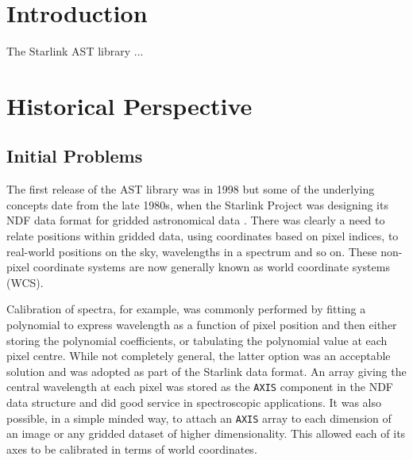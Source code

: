 \documentclass[final,authoryear,5p,times,twocolumn]{elsarticle}
\begin{document}

\newcommand{\mnras}{Mon Not R Astron Soc}
\newcommand{\aap}{Astron Astrophys}
\newcommand{\aaps}{Astron Astrophys Supp}
\newcommand{\pasp}{Pub Astron Soc Pacific}
\newcommand{\apj}{Astrophys J}
\newcommand{\apjs}{Astrophys J Supp}
\newcommand{\qjras}{Quart J R Astron Soc}
\newcommand{\an}{Astron.\ Nach.}
\newcommand{\ijimw}{Int.\ J.\ Infrared \& Millimeter Waves}
\newcommand{\procspie}{Proc.\ SPIE}
\newcommand{\aspconf}{ASP Conf. Ser.}

\newcommand{\ascl}[1]{\href{http://www.ascl.net/#1}{ascl:#1}}

\section{Introduction}
\label{sec:intro}
The Starlink AST library \citep[][\ascl{1404.016}]{SUN211} ...

\section{Historical Perspective}

\subsection{Initial Problems}

The first release of the AST library was in 1998
\citep{1998StarB..20....7D,1998ASPC..145...41W} but some of the
underlying concepts date from the late 1980s, when the Starlink
Project was designing its NDF data format for gridded astronomical
data \citep{2015Jenness}. There was clearly a need to relate positions
within gridded data, using coordinates based on pixel indices, to
real-world positions on the sky, wavelengths in a spectrum and so
on. These non-pixel coordinate systems are now generally known as
world coordinate systems (WCS).

Calibration of spectra, for example, was commonly performed by fitting
a polynomial to express wavelength as a function of pixel position and
then either storing the polynomial coefficients, or tabulating the
polynomial value at each pixel centre. While not completely general,
the latter option was an acceptable solution and was adopted as part
of the Starlink data format. An array giving the central wavelength at
each pixel was stored as the \texttt{AXIS} component in the NDF data
structure and did good service in spectroscopic applications. It was
also possible, in a simple minded way, to attach an \texttt{AXIS}
array to each dimension of an image or any gridded dataset of higher
dimensionality. This allowed each of its axes to be calibrated in
terms of world coordinates.
\end{document}
